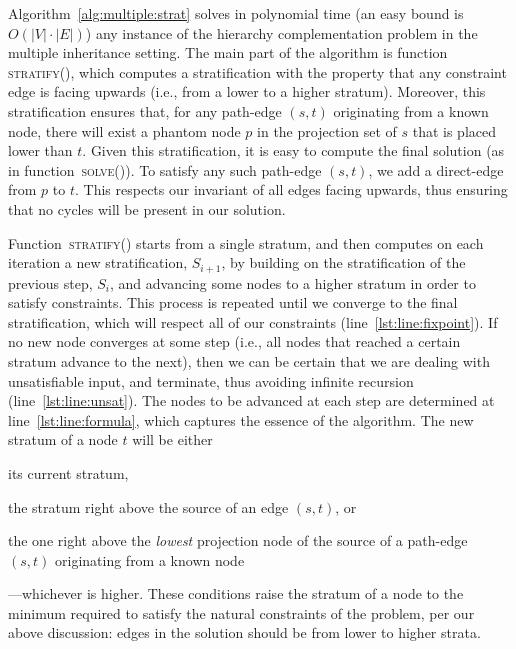 

Algorithm~\ref{alg:multiple:strat} solves in polynomial time (an easy bound is
$O(|V| \cdot |E|)$) any
instance of the hierarchy complementation problem in the multiple
inheritance setting. The main part of the algorithm is
function \textsc{stratify()}, which computes a stratification with the
property that any constraint edge is facing upwards (i.e., from a
lower to a higher stratum). Moreover, this stratification ensures
that, for any path-edge $(s,t)$ originating from a known node, there
will exist a phantom node $p$ in the projection set of $s$ that is
placed lower than $t$. Given this stratification, it is easy to
compute the final solution (as in function~\textsc{solve()}). To
satisfy any such path-edge $(s,t)$, we add a direct-edge from $p$ to
$t$. This respects our invariant of all edges facing upwards, thus
ensuring that no cycles will be present in our solution.

Function~\textsc{stratify()} starts from a single stratum, and then
computes on each iteration a new stratification, $S_{i+1}$, by
building on the stratification of the previous step, $S_{i}$, and
advancing some nodes to a higher stratum in order to satisfy
constraints. This process is repeated until we converge to the final
stratification, which will respect all of our constraints
(line~\ref{lst:line:fixpoint}). If no new node converges at some step
(i.e., all nodes that reached a certain stratum advance to the next),
then we can be certain that we are dealing with unsatisfiable input,
and terminate, thus avoiding infinite recursion
(line~\ref{lst:line:unsat}). The nodes to be advanced at each step are
determined at line~\ref{lst:line:formula}, which captures the essence
of the algorithm. The new stratum of a node $t$ will be either%
\begin{inparaenum}[(i)]
\item its current stratum,
\item the stratum right above the source of an edge $(s,t)$, or
\item the one right above the \emph{lowest} projection node of the
  source of a path-edge $(s,t)$ originating from a known node%
\end{inparaenum}%
---whichever is higher.  These conditions raise the stratum of a node
to the minimum required to satisfy the natural constraints of the
problem, per our above discussion: edges in the solution should be
from lower to higher strata.

